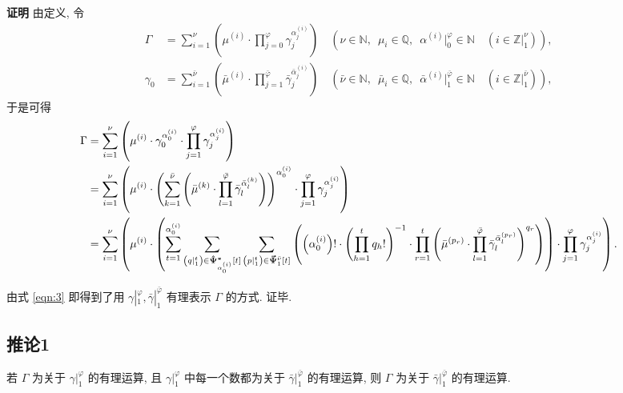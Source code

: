 \documentclass{article}
\renewcommand\.{.\hspace{3pt}}
\renewcommand\,{,\hspace{4pt}}
\renewcommand\:{:\hspace{3pt}}
\newcommand\A{,\hspace{6pt}}
\begin{document}
	\textbf{证明} \quad 由定义\, 令
	\begin{align*}
		\Gamma & = \sum_{i=1}^{\nu} \left( \mu^{(i)} \cdot \prod_{j=0}^{\varphi} \gamma_{j}^{\alpha_{j}^{(i)}} \right) \quad \left( \nu \in \mathbb{N} \A \mu_{i} \in \mathbb{Q} \A \alpha^{(i)} |_{0}^{\varphi} \in \mathbb{N} \quad \left( i \in \mathbb{Z} |_{1}^{\nu} \right) \right) \, \\
		\gamma_{0} & = \sum_{i=1}^{\bar{\nu}} \left( \bar{\mu}^{(i)} \cdot \prod_{j=1}^{\bar{\varphi}} \bar{\gamma}_{j}^{\bar{\alpha}_{j}^{(i)}} \right) \quad \left( \bar{\nu} \in \mathbb{N} \A \bar{\mu}_{i} \in \mathbb{Q} \A \bar{\alpha}^{(i)} |_{1}^{\bar{\varphi}} \in \mathbb{N} \quad \left( i \in \mathbb{Z} |_{1}^{\bar{\nu}} \right) \right) \,
	\end{align*}
	于是可得
	\begin{align} \label{eqn:3}
		\Gamma & = \sum_{i=1}^{\nu} \left( \mu^{(i)} \cdot \gamma_{0}^{\alpha_{0}^{(i)}} \cdot \prod_{j=1}^{\varphi} \gamma_{j}^{\alpha_{j}^{(i)}} \right) \notag \\
		& = \sum_{i=1}^{\nu} \left( \mu^{(i)} \cdot \left( \sum_{k=1}^{\bar{\nu}} \left( \bar{\mu}^{(k)} \cdot \prod_{l=1}^{\bar{\varphi}} \bar{\gamma}_{l}^{\bar{\alpha}_{l}^{(k)}} \right) \right)^{\alpha_{0}^{(i)}} \cdot \prod_{j=1}^{\varphi} \gamma_{j}^{\alpha_{j}^{(i)}} \right) \notag \\
		& = \sum_{i=1}^{\nu} \left( \mu^{(i)} \cdot \left( \sum_{t=1}^{\alpha_{0}^{(i)}} \sum_{\left( q |_{1}^{t} \right) \in \bm{\hat{\Psi}}_{\alpha_{0}^{(i)}}^{\bm{\ast}} \left[ t \right]} \sum_{\left( p |_{1}^{t} \right) \in \bm{\vec{\Psi}}_{1}^{\bar{\nu}} \left[ t \right]} \left( \left( \alpha_{0}^{(i)} \right)! \cdot \left( \prod_{h=1}^{t} q_{h}! \right)^{-1} \cdot \prod_{r=1}^{t} \left( \bar{\mu}^{(p_{r})} \cdot \prod_{l=1}^{\bar{\varphi}} \bar{\gamma}_{l}^{\bar{\alpha}_{l}^{(p_{r})}} \right)^{q_{r}} \right) \right) \cdot \prod_{j=1}^{\varphi} \gamma_{j}^{\alpha_{j}^{(i)}} \right) \.
	\end{align}
	
	由式 \eqref{eqn:3} 即得到了用 $\gamma |_{1}^{\varphi} , \bar{\gamma} |_{1}^{\bar{\varphi}}$ 有理表示 $\Gamma$ 的方式\. 证毕\.
	
	\subsection{推论1} \label{sec:3.2}
	若 $\Gamma$ 为关于 $\gamma |_{1}^{\varphi}$ 的有理运算\, 且 $\gamma |_{1}^{\varphi}$ 中每一个数都为关于 $\bar{\gamma} |_{1}^{\bar{\varphi}}$ 的有理运算\, 则 $\Gamma$ 为关于 $\bar{\gamma} |_{1}^{\bar{\varphi}}$ 的有理运算\.
	
\end{document}
